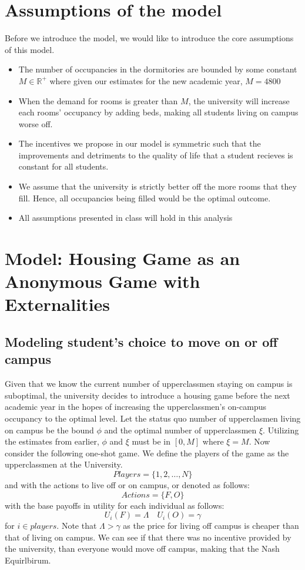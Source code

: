 \documentclass[12pt]{article}
\newcommand{\R}{\mathbb{R}}
\begin{document}
\section{Assumptions of the model}
Before we introduce the model, we would like to introduce the core assumptions of this model. 
\begin{itemize}
    \item The number of occupancies in the dormitories are bounded by some constant $M \in \R^+$ where given our estimates for the new academic year, $M = 4800$
    \item When the demand for rooms is greater than $M$, the university will increase each rooms'  occupancy by adding beds, making all students living on campus worse off. 
    \item The incentives we propose in our model is symmetric such that the improvements and detriments to the quality of life that a student recieves is constant for all students.
    \item We assume that the university is strictly better off the more rooms that they fill. Hence,  all occupancies being filled would be the optimal outcome. 
    \item All assumptions presented in class will hold in this analysis
\end{itemize}
\section{Model: Housing Game as an Anonymous Game with Externalities}
\subsection{Modeling student's choice to move on or off campus}
Given that we know the current number of upperclassmen staying on campus is suboptimal, the university decides to introduce a housing game before the next academic year in the hopes of increasing the upperclassmen's on-campus occupancy to the optimal level. Let the status quo number of upperclasmen living on campus be the bound $\phi$ and the optimal number of upperclassmen $\xi$. Utilizing the estimates from earlier, $\phi$ and $\xi$ must be in $[0,M]$ where $\xi = M$. Now consider the following one-shot game. We define the players of the game as the upperclassmen at the University.
\[
Players = \{1, 2, \dots, N \}
\]
and with the actions to live off or on campus, or denoted as follows:
\[
Actions = \{F, O\}
\]
with the base payoffs in utility for each individual as follows:
\[
U_i(F) = \Lambda \quad U_i(O) = \gamma
\]
for $i \in players$. Note that $\Lambda > \gamma$ as the price for living off campus is cheaper than that of living on campus. We can see if that there was no incentive provided by the university, than everyone would move off campus, making that the Nash Equirlbirum. 
\end{document}
